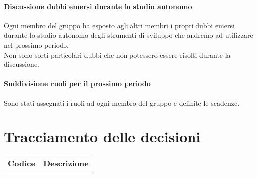 \documentclass{article}
\begin{document}
\paragraph*{Discussione dubbi emersi durante lo studio autonomo}
Ogni membro del gruppo ha esposto agli altri membri i propri dubbi emersi durante lo studio autonomo degli strumenti di sviluppo che andremo ad utilizzare nel prossimo periodo. \\
Non sono sorti particolari dubbi che non potessero essere risolti durante la discussione.

\paragraph*{Suddivisione ruoli per il prossimo periodo}
Sono stati assegnati i ruoli ad ogni membro del gruppo e definite le scadenze.


\section{Tracciamento delle decisioni}
\begin{table}[H]
  \centering
  \begin{tabular}{p{4cm}|p{12cm}}
    \rowcolor{lightgray}
    \textbf{Codice}  & \textbf{Descrizione}      \\
      &  \\
  \end{tabular}
\end{table}
\end{document}
